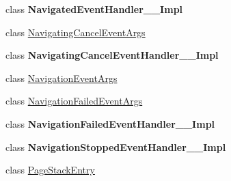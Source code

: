 \begin{DoxyCompactItemize}
class {\bfseries Navigated\+Event\+Handler\+\_\+\+\_\+\+Impl}
\item 
class \hyperlink{class_windows_1_1_u_i_1_1_xaml_1_1_navigation_1_1_navigating_cancel_event_args}{Navigating\+Cancel\+Event\+Args}
\item 
class {\bfseries Navigating\+Cancel\+Event\+Handler\+\_\+\+\_\+\+Impl}
\item 
class \hyperlink{class_windows_1_1_u_i_1_1_xaml_1_1_navigation_1_1_navigation_event_args}{Navigation\+Event\+Args}
\item 
class \hyperlink{class_windows_1_1_u_i_1_1_xaml_1_1_navigation_1_1_navigation_failed_event_args}{Navigation\+Failed\+Event\+Args}
\item 
class {\bfseries Navigation\+Failed\+Event\+Handler\+\_\+\+\_\+\+Impl}
\item 
class {\bfseries Navigation\+Stopped\+Event\+Handler\+\_\+\+\_\+\+Impl}
\item 
class \hyperlink{class_windows_1_1_u_i_1_1_xaml_1_1_navigation_1_1_page_stack_entry}{Page\+Stack\+Entry}
\end{DoxyCompactItemize}
